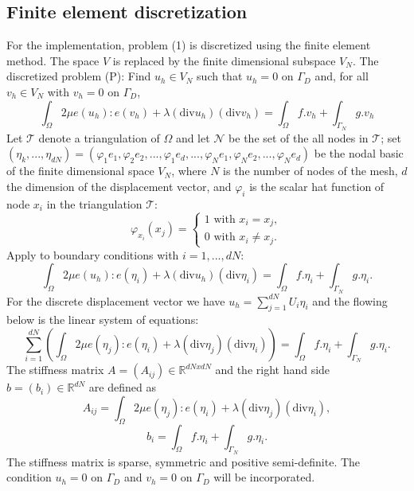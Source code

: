 \documentclass[notitlepage,a4paper,fleqn,9pt]{icmfarticle}
\begin{document}
\begin{multicols}{2}
\subsection{Finite element discretization}
For the implementation, problem (1) is discretized using the finite element
method. The space $V$ is replaced by the finite dimensional subspace $V_N$. The discretized problem (P): Find $u_h \in V_N$
such that $u_h = 0$ on $\Gamma_D$ and, for all $v_h \in V_N$ with $v_h = 0$ on $\Gamma_D$,
$$\int_\Omega 2\mu e(u_h) : e(v_h) + \lambda(\text{div}u_h)(\text{div}v_h) = \int_\Omega f.v_h + \int_{\Gamma_N}g.v_h$$
Let $\mathcal{T}$ denote a triangulation of $\Omega$ and let $\mathcal{N}$ be the set of the all nodes in $\mathcal{T}$; set $(\eta_k,...,\eta_{dN})=(\varphi_1e_1, \varphi_2e_2,...,\varphi_1e_d,...,\varphi_Ne_1,\varphi_Ne_2,...,\varphi_Ne_d)$ be the nodal basic of the finite dimensional space $V_N$, where $N$ is the number of nodes of the mesh, $d$ the dimension of the displacement vector, and $\varphi_i$ is the scalar hat function of node $x_i$ in the triangulation $\mathcal{T}$:
$$\varphi_{x_i}(x_j) = \begin{cases}
1 \text{ with } x_i = x_j, \\
0 \text{ with } x_i \neq x_j.
\end{cases}$$
Apply to boundary conditions with $i = 1,...,dN$:
$$\int_\Omega 2\mu e(u_h) : e(\eta_i) + \lambda(\text{div}u_h)(\text{div}\eta_i) = \int_\Omega f.\eta_i + \int_{\Gamma_N}g.\eta_i.$$
For the discrete displacement vector we have $u_h = \sum_{j=1}^{dN}U_i\eta_i$ and the flowing below is the linear system of equations:
$$\displaystyle\sum^{dN}_{i=1}(\displaystyle\int_\Omega 2\mu e(\eta_j) : e(\eta_i) + \lambda(\text{div}\eta_j)(\text{div}\eta_i)) = \int_\Omega f.\eta_i + \int_{\Gamma_N}g.\eta_i.$$
The stiffness matrix $A=(A_{ij})\in\mathbb{R}^{dN x dN}$ and the right hand side $b=(b_i)\in\mathbb{R}^{dN}$ are defined as
$$A_{ij}=\displaystyle\int_\Omega 2\mu e(\eta_j) : e(\eta_i) + \lambda(\text{div}\eta_j)(\text{div}\eta_i),$$
$$b_i=\int_\Omega f.\eta_i + \int_{\Gamma_N}g.\eta_i.$$
The stiffness matrix is sparse, symmetric and positive semi-definite. The condition $u_h = 0$ on $\Gamma_D$ and $v_h = 0$ on $\Gamma_D$ will be incorporated.


\end{multicols}
\end{document}
